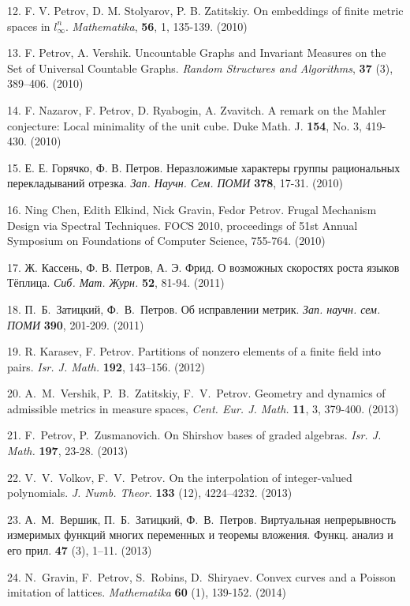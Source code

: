 \documentclass[12pt,russian]{article}
\begin{document}
12. F. V. Petrov, D. M. Stolyarov, P. B. Zatitskiy. On embeddings of finite metric spaces in $l_{\infty}^n$.
{\it Mathematika}, {\bf 56}, 1, 135-139. (2010)

13. F. Petrov, A. Vershik. Uncountable Graphs and Invariant Measures on the Set of Universal Countable Graphs. {\it Random Structures and Algorithms},
{\textbf{37}} (3),  389–406. (2010)


14. F. Nazarov, F. Petrov, D. Ryabogin, A. Zvavitch. A remark on the Mahler
conjecture: Local minimality of the unit cube. Duke Math. J. {\textbf {154}}, No. 3, 419-430. (2010)

15. Е. Е. Горячко, Ф. В. Петров. Неразложимые характеры группы рациональных
перекладываний отрезка. {\it Зап. Научн. Сем. ПОМИ} {\bf 378}, 17-31. (2010)

16. Ning Chen, Edith Elkind, Nick Gravin, Fedor Petrov.
Frugal Mechanism Design via Spectral Techniques.
FOCS 2010, proceedings of 51st Annual Symposium on Foundations of Computer Science,
755-764. (2010)

17. Ж. Кассень, Ф. В. Петров, А. Э. Фрид. О возможных скоростях
роста языков Тёплица. {\it Сиб. Мат. Журн.} {\bf 52}, 81-94. (2011)

18. П.~Б.~Затицкий, Ф.~В.~Петров. Об исправлении метрик. {\it Зап. научн. сем. ПОМИ}
\textbf{390}, 201-209. (2011)


19. R. Karasev, F. Petrov. Partitions of nonzero elements of a finite field into pairs.
{\it Isr. J. Math.} {\bf 192}, 143--156. (2012)




20. A.~M.~Vershik, P.~B.~Zatitskiy, F.~V.~Petrov.
Geometry and dynamics of admissible metrics in measure spaces, {\it Cent. Eur. J. Math.} {\bf 11}, 3,
379-400. (2013)

 

21. F.~Petrov, P.~Zusmanovich. On Shirshov bases of graded algebras.
 {\it Isr. J. Math.} {\bf 197}, 23-28. (2013)
 
22. V.~V.~Volkov, F.~V.~Petrov. On the interpolation of integer-valued polynomials.
{\it J. Numb. Theor.}
{\bf 133} (12), 4224–4232. (2013)


23.
А.~М.~Вершик, П.~Б.~Затицкий, Ф.~В.~Петров.
Виртуальная непрерывность измеримых функций многих переменных и теоремы вложения.
Функц. анализ и его прил. {\bf 47} (3), 1–11. (2013)

24. N.~Gravin, F.~Petrov, S.~Robins, D.~Shiryaev.
Convex curves and a Poisson imitation of lattices.
{\it Mathematika} {\bf 60} (1), 139-152. (2014)
\end{document}
